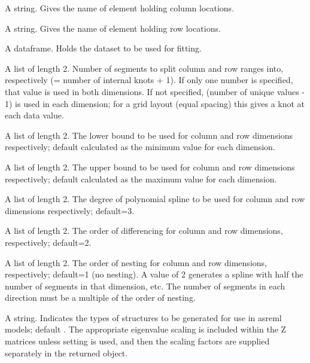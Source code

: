 \documentclass[a4paper]{book}
\begin{document}
\begin{Arguments}
\begin{ldescription}
\item[\code{columncoordinates}] A string. Gives the name of  element
holding column locations.

\item[\code{rowcoordinates}] A string. Gives the name of  element
holding row locations.

\item[\code{data}] A dataframe. Holds the dataset to be used for fitting.

\item[\code{nsegments}] A list of length 2. Number of segments to split column and
row ranges into, respectively (= number of internal knots + 1). If only
one number is specified, that value is used in both dimensions. If not
specified, (number of unique values - 1) is used in each dimension;
for a grid layout (equal spacing) this gives a knot at each data value.

\item[\code{minbound}] A list of length 2. The lower bound to be used for column
and row dimensions respectively; default calculated as the minimum value
for each dimension.

\item[\code{maxbound}] A list of length 2. The upper bound to be used for column
and row dimensions respectively; default calculated as the maximum value
for each dimension.

\item[\code{degree}] A list of length 2. The degree of polynomial spline to be used
for column and row dimensions respectively; default=3.

\item[\code{penaltyord}] A list of length 2. The order of differencing for column
and row dimensions, respectively; default=2.

\item[\code{nestorder}] A list of length 2. The order of nesting for column and row
dimensions, respectively; default=1 (no nesting). A value of 2 generates
a spline with half the number of segments in that dimension, etc. The
number of segments in each direction must be a multiple of the order
of nesting.

\item[\code{asreml}] A string. Indicates the types of structures to be generated
for use in asreml models; default . The
appropriate eigenvalue scaling is included within the Z matrices unless
setting  is used, and then the scaling factors are
supplied separately in the returned object.
\begin{itemize}


\end{itemize}
\end{ldescription}
\end{Arguments}
\end{document}
